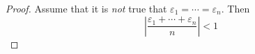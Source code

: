 \documentclass[../notes.tex]{subfiles}
\begin{document}
\begin{itemize}
    \begin{proof}
        Assume that it is \emph{not} true that $\varepsilon_1=\cdots=\varepsilon_n$. Then
        \begin{equation*}
            \left| \frac{\varepsilon_1+\cdots+\varepsilon_n}{n} \right| < 1

\end{equation*}
\end{proof}
\end{itemize}
\end{document}
